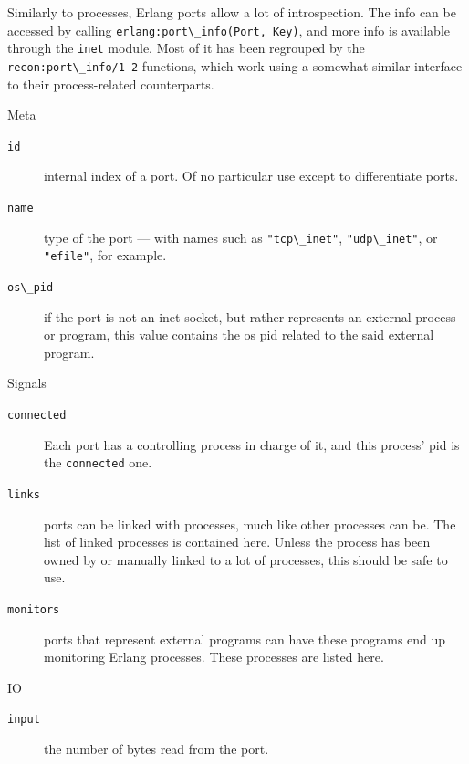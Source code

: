 \documentclass[11pt, oneside]{book}   	%
\newcommand{\module}[1]{\Verb`#1`}
\newcommand{\function}[1]{\Verb`#1`}
\newcommand{\expression}[1]{\Verb`#1`}
\begin{document}
Similarly to processes, Erlang ports allow a lot of introspection. The info can be accessed by calling \function{erlang:port\_info(Port, Key)}, and more info is available through the \module{inet} module. Most of it has been regrouped by the \function{recon:port\_info/1-2} functions, which work using a somewhat similar interface to their process-related counterparts. 

\begin{description*}
	\item[Meta] \hfill
		\begin{description}		
			\item[\expression{id}] internal index of a port. Of no particular use except to differentiate ports.
			
			\item[\expression{name}] type of the port — with names such as \expression{"tcp\_inet"}, \expression{"udp\_inet"}, or \expression{"efile"}, for example.
			
			\item[\expression{os\_pid}] if the port is not an inet socket, but rather represents an external process or program, this value contains the os pid related to the said external program.
		\end{description}

	\item[Signals] \hfill
		\begin{description}		
			\item[\expression{connected}] Each port has a controlling process in charge of it, and this process' pid is the \expression{connected} one.
			
			\item[\expression{links}] ports can be linked with processes, much like other processes can be. The list of linked processes is contained here. Unless the process has been owned by or manually linked to a lot of processes, this should be safe to use.
			
			\item[\expression{monitors}] ports that represent external programs can have these programs end up monitoring Erlang processes. These processes are listed here.
		\end{description}
		
	\item[IO] \hfill
		\begin{description}		
			\item[\expression{input}] the number of bytes read from the port.
			

\end{description}
\end{description*}
\end{document}
